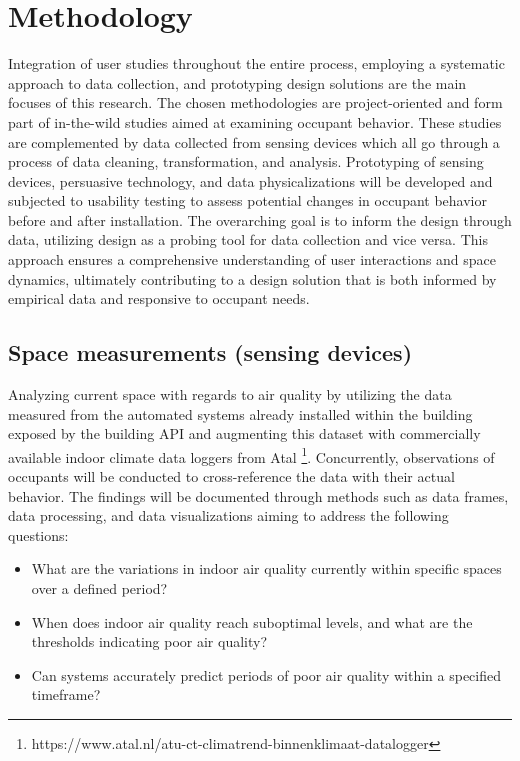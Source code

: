 \section{Methodology}

Integration of user studies throughout the entire process, employing a systematic approach to data collection, and prototyping design solutions are the main focuses of this research. The chosen methodologies are project-oriented and form part of in-the-wild studies aimed at examining occupant behavior. These studies are complemented by data collected from sensing devices which all go through a process of data cleaning, transformation, and analysis. Prototyping of sensing devices, persuasive technology, and data physicalizations will be developed and subjected to usability testing to assess potential changes in occupant behavior before and after installation. The overarching goal is to inform the design through data, utilizing design as a probing tool for data collection and vice versa. This approach ensures a comprehensive understanding of user interactions and space dynamics, ultimately contributing to a design solution that is both informed by empirical data and responsive to occupant needs.

\subsection{Space measurements (sensing devices)}

Analyzing current space with regards to air quality by utilizing the data measured from the automated systems already installed within the building exposed by the building API and augmenting this dataset with commercially available indoor climate data loggers from Atal \footnote{https://www.atal.nl/atu-ct-climatrend-binnenklimaat-datalogger}. Concurrently, observations of occupants will be conducted to cross-reference the data with their actual behavior. The findings will be documented through methods such as data frames, data processing, and data visualizations aiming to address the following questions:

\begin{itemize}
  \item What are the variations in indoor air quality currently within specific spaces over a defined period?
  \item When does indoor air quality reach suboptimal levels, and what are the thresholds indicating poor air quality?
  \item Can systems accurately predict periods of poor air quality within a specified timeframe?
\end{itemize}

